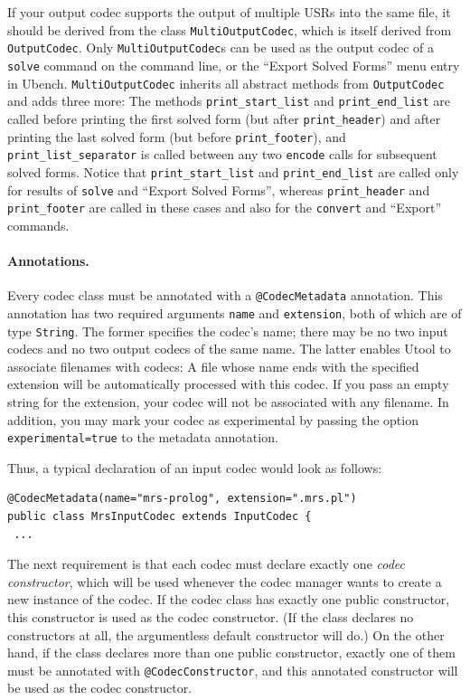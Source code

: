If your output codec supports the output of multiple USRs into the same file,
it should be derived from the class \verb?MultiOutputCodec?, which is itself
derived from \verb?OutputCodec?. Only \verb?MultiOutputCodec?s can be used
as the output codec of a \verb?solve? command on the command line, or
the ``Export Solved Forms'' menu entry in Ubench. \verb?MultiOutputCodec? inherits
all abstract methods from \verb?OutputCodec? and adds three more: The methods \verb?print_start_list? and \verb?print_end_list? are
called before printing the first solved form (but after \verb?print_header?) 
and after printing the last solved form (but before \verb?print_footer?), and \verb?print_list_separator?
is called between any two \verb?encode? calls for subsequent solved forms. Notice
that \verb?print_start_list? and \verb?print_end_list? are called only for results of
\verb?solve? and ``Export Solved Forms'', whereas \verb?print_header? and \verb?print_footer?
are called in these cases and also for the \verb?convert? and ``Export'' commands.


\paragraph{Annotations.}
Every codec class must be annotated with a \verb?@CodecMetadata? annotation. This 
annotation has two required arguments \verb?name? and \verb?extension?, both of
which are of type \verb?String?. The former specifies the codec's name; there may be no
two input codecs and no two output codecs of the same name. The latter enables Utool
to associate filenames with codecs: A file whose name ends with the specified extension
will be automatically processed with this codec. If you pass an empty string for the extension,
your codec will not be associated with any filename. In addition, you may mark your
codec as experimental by passing the option \verb?experimental=true? to the metadata
annotation.

Thus, a typical declaration of an input codec would look as follows:

\begin{verbatim}
@CodecMetadata(name="mrs-prolog", extension=".mrs.pl")
public class MrsInputCodec extends InputCodec {
 ...
\end{verbatim}

The next requirement is that each codec must declare exactly one \emph{codec constructor},
which will be used whenever the codec manager wants to create a new instance of the
codec.
If the codec class has exactly one public constructor, this constructor is used as the
codec constructor. (If the class declares no constructors at all, the argumentless default
constructor will do.) On the other hand, if the class declares more than
one public constructor, exactly one of them must be annotated with \verb?@CodecConstructor?,
and this annotated constructor will be used as the codec constructor.

